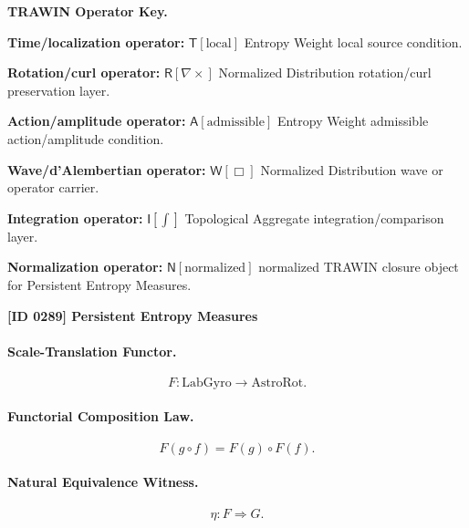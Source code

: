 \par\vspace{0.45\baselineskip}
\noindent\begin{minipage}[t]{\linewidth}
\begingroup
\small
\raggedright
\textbf{TRAWIN Operator Key.}\par
\noindent\textbf{Time/localization operator:} $\mathsf{T}\!\left[\mathrm{local}\right]$ Entropy Weight local source condition.\par
\noindent\textbf{Rotation/curl operator:} $\mathsf{R}\!\left[\nabla\times\right]$ Normalized Distribution rotation/curl preservation layer.\par
\noindent\textbf{Action/amplitude operator:} $\mathsf{A}\!\left[\mathrm{admissible}\right]$ Entropy Weight admissible action/amplitude condition.\par
\noindent\textbf{Wave/d'Alembertian operator:} $\mathsf{W}\!\left[\Box\right]$ Normalized Distribution wave or operator carrier.\par
\noindent\textbf{Integration operator:} $\mathsf{I}\!\left[\int\right]$ Topological Aggregate integration/comparison layer.\par
\noindent\textbf{Normalization operator:} $\mathsf{N}\!\left[\mathrm{normalized}\right]$ normalized TRAWIN closure object for Persistent Entropy Measures.\par
\endgroup
\end{minipage}

\clearpage
\noindent\textbf{[ID 0289] Persistent Entropy Measures}\par
\vspace{0.35em}
\paragraph{Scale-Translation Functor.}
\begin{equation}
F:\mathrm{LabGyro}\longrightarrow\mathrm{AstroRot}.
\end{equation}

\paragraph{Functorial Composition Law.}
\begin{equation}
F(g\circ f)
=
F(g)\circ F(f).
\end{equation}

\paragraph{Natural Equivalence Witness.}
\begin{equation}
\eta:F\Rightarrow G .
\end{equation}

